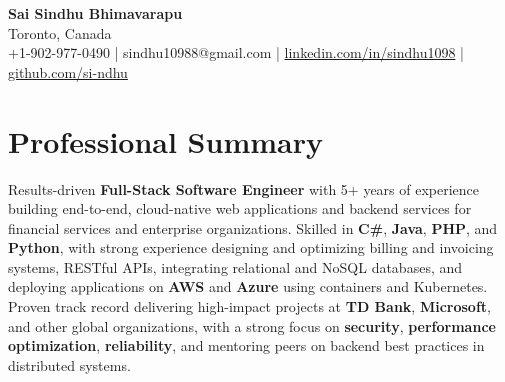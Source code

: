 \documentclass[letterpaper,11pt]{article}
\begin{document}
\begin{center}
  {\Large \textbf{Sai Sindhu Bhimavarapu}} \\
  Toronto, Canada \\
  +1-902-977-0490 \enspace | \enspace sindhu10988@gmail.com \enspace | \enspace \href{https://www.linkedin.com/in/sindhu1098/}{linkedin.com/in/sindhu1098} \enspace | \enspace \href{https://github.com/si-ndhu}{github.com/si-ndhu}
\end{center}

\section{Professional Summary}
  \begin{itemize}[leftmargin=0.15in, label={}]
    \small{\item{
     Results-driven \textbf{Full-Stack Software Engineer} with 5+ years of experience building end-to-end, cloud-native web applications and backend services for financial services and enterprise organizations. Skilled in \textbf{C\#}, \textbf{Java}, \textbf{PHP}, and \textbf{Python}, with strong experience designing and optimizing billing and invoicing systems, RESTful APIs, integrating relational and NoSQL databases, and deploying applications on \textbf{AWS} and \textbf{Azure} using containers and Kubernetes. Proven track record delivering high-impact projects at \textbf{TD Bank}, \textbf{Microsoft}, and other global organizations, with a strong focus on \textbf{security}, \textbf{performance optimization}, \textbf{reliability}, and mentoring peers on backend best practices in distributed systems.
    }}
  \end{itemize}
\vspace{-16pt}

\end{document}
